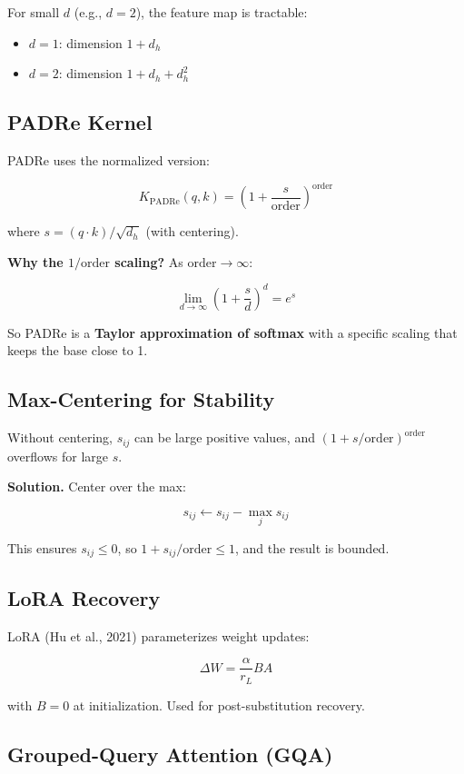 For small $d$ (e.g., $d = 2$), the feature map is tractable:
\begin{itemize}
\item $d = 1$: dimension $1 + d_h$
\item $d = 2$: dimension $1 + d_h + d_h^2$

\end{itemize}
\subsection{PADRe Kernel}

PADRe uses the normalized version:

\[
K_\text{PADRe}(q, k) = \left(1 + \frac{s}{\text{order}}\right)^\text{order}
\tag{3.7}
\]

where $s = (q \cdot k)/\sqrt{d_h}$ (with centering).

\textbf{Why the $1/\text{order}$ scaling?} As $\text{order} \to \infty$:

\[
\lim_{d \to \infty} \left(1 + \frac{s}{d}\right)^d = e^s
\tag{3.8}
\]

So PADRe is a \textbf{Taylor approximation of softmax} with a specific 
scaling that keeps the base close to 1.

\subsection{Max-Centering for Stability}

Without centering, $s_{ij}$ can be large positive values, and 
$(1 + s/\text{order})^\text{order}$ overflows for large $s$.

\textbf{Solution.} Center over the max:

\[
s_{ij} \leftarrow s_{ij} - \max_j s_{ij}
\tag{3.9}
\]

This ensures $s_{ij} \leq 0$, so $1 + s_{ij}/\text{order} \leq 1$, and 
the result is bounded.

\subsection{LoRA Recovery}

LoRA (Hu et al., 2021) parameterizes weight updates:

\[
\Delta W = \frac{\alpha}{r_L} B A
\tag{3.10}
\]

with $B = 0$ at initialization. Used for post-substitution recovery.

\subsection{Grouped-Query Attention (GQA)}

